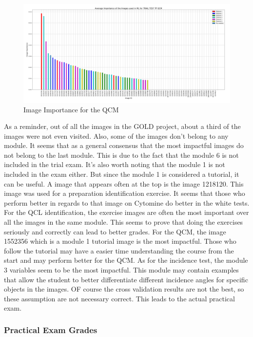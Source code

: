 \documentclass[a4paper,11pt]{report}
\numberwithin{figure}{section} %
\begin{document}
      \begin{figure}[H]
      \centering
      \includegraphics[width=.95\linewidth]{im_importance_TRIAL_TEST_TP_QCM_2018-04-29_14_34_19.png}
      \caption{Image Importance for the QCM}
      \label{fig:im_white3}
      \end{figure}
    
    As a reminder, out of all the images in the GOLD project, about a third of the images were not even visited. Also, some of the images don't belong to any module. It seems that as a general consensus that the most impactful images do not belong to the last module. This is due to the fact that the module 6 is not included in the trial exam. It's also worth noting that the module 1 is not included in the exam either. But since the module 1 is considered a tutorial, it can be useful. A image that appears often at the top is the image 1218120. This image was used for a preparation identification exercise. It seems that those who perform better in regards to that image on Cytomine do better in the white tests. For the QCL identification, the exercise images are often the most important over all the images in the same module. This seems to prove that doing the exercises seriously and correctly can lead to better grades. For the QCM, the image 1552356 which is a module 1 tutorial image is the most impactful. Those who follow the tutorial may have a easier time understanding the course from the start and may perform better for the QCM. As for the incidence test, the module 3 variables seem to be the most impactful. This module may contain examples that allow the student to better differentiate different incidence angles for specific objects in the images. OF course the cross validation results are not the best, so these assumption are not necessary correct. This leads to the actual practical exam.
    
    \subsubsection{Practical Exam Grades}
\end{document}
